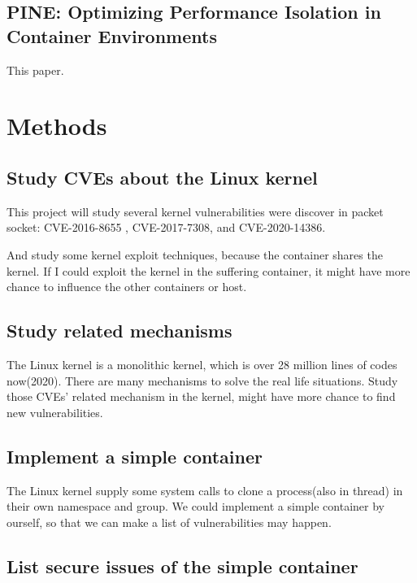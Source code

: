 \documentclass[12pt,a4paper,oneside]{IEEEconf}
\begin{document}
\subsection{PINE: Optimizing Performance Isolation in Container Environments}
This paper\cite{Optimizing}.


\section{Methods}
\subsection{Study CVEs about the Linux kernel}
This project will study several kernel vulnerabilities were discover in packet socket: CVE-2016-8655
\cite{CVE-2016-8655}, CVE-2017-7308\cite{CVE-2017-7308}, and CVE-2020-14386\cite{CVE-2020-14386}.

And study some kernel exploit techniques\cite{Kernel_exploitation}, because the container shares
the kernel. If I could exploit the kernel in the suffering container, it might have more chance
to influence the other containers or host.

\subsection{Study related mechanisms}
The Linux kernel is a monolithic kernel, which is over 28 million lines of codes now(2020). There
are many mechanisms to solve the real life situations. Study those CVEs' related mechanism in the
kernel, might have more chance to find new vulnerabilities.

\subsection{Implement a simple container}
The Linux kernel supply some system calls to clone a process(also in thread) in their own namespace
and group. We could implement a simple container by ourself, so that we can make a list of
vulnerabilities may happen.
\UseRawInputEncoding


\subsection{List secure issues of the simple container}
\end{document}
